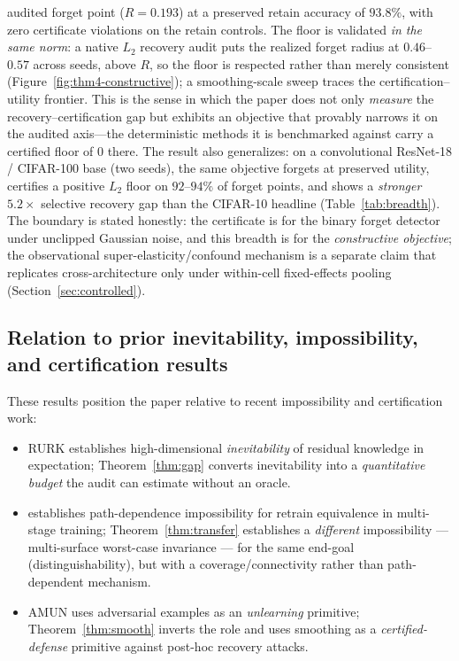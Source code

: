 \begin{enumerate}[leftmargin=1.5em,topsep=0pt]
    audited forget point ($R=0.193$) at a preserved retain accuracy of $93.8\%$,
    with zero certificate violations on the retain controls. The floor is
    validated \emph{in the same norm}: a native $L_2$ recovery audit puts the
    realized forget radius at $0.46$--$0.57$ across seeds, above $R$, so the
    floor is respected rather than merely consistent
    (Figure~\ref{fig:thm4-constructive}); a smoothing-scale sweep traces the
    certification--utility frontier. This is the sense in which the paper does
    not only \emph{measure} the recovery--certification gap but exhibits an
    objective that provably narrows it on the audited axis---the deterministic
    methods it is benchmarked against carry a certified floor of $0$ there. The
    result also generalizes: on a convolutional ResNet-18 / CIFAR-100 base (two
    seeds), the same objective forgets at preserved utility, certifies a positive
    $L_2$ floor on $92$--$94\%$ of forget points, and shows a \emph{stronger}
    $5.2\times$ selective recovery gap than the CIFAR-10 headline
    (Table~\ref{tab:breadth}). The boundary is stated honestly: the certificate
    is for the binary forget detector under unclipped Gaussian noise, and this
    breadth is for the \emph{constructive objective}; the observational
    super-elasticity/confound mechanism is a separate claim that replicates
    cross-architecture only under within-cell fixed-effects pooling
    (Section~\ref{sec:controlled}).
\end{enumerate}

\subsection{Relation to prior inevitability, impossibility, and certification results}

These results position the paper relative to recent impossibility and
certification work:

\begin{itemize}[leftmargin=1.5em,topsep=0pt]
  \item RURK \cite{hsu2025rurk} establishes high-dimensional
    \emph{inevitability} of residual knowledge in expectation;
    Theorem~\ref{thm:gap} converts inevitability into a \emph{quantitative
    budget} the audit can estimate without an oracle.
  \item \cite{yu2025impossibility} establishes path-dependence
    impossibility for retrain equivalence in multi-stage training;
    Theorem~\ref{thm:transfer} establishes a \emph{different} impossibility
    --- multi-surface worst-case invariance --- for the same end-goal
    (distinguishability), but with a coverage/connectivity rather than
    path-dependent mechanism.
  \item AMUN \cite{krishna2025amun} uses adversarial examples as an
    \emph{unlearning} primitive; Theorem~\ref{thm:smooth} inverts the role
    and uses smoothing as a \emph{certified-defense} primitive against
    post-hoc recovery attacks.
\end{itemize}

